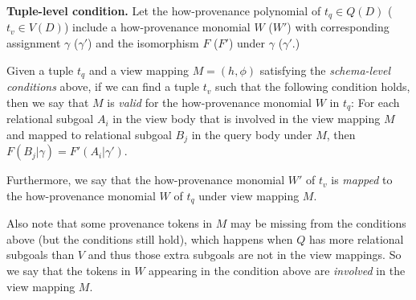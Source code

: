 \begin{definition}
{\bf Tuple-level condition.}
Let the how-pro\-venance polynomial of $t_q \in Q(D)$ ($t_v \in V(D)$) include a how-provenance monomial $W$ ($W'$) with corresponding assignment $\gamma$ ($\gamma'$) and the isomorphism $F$ ($F'$) under $\gamma$ ($\gamma'$.)

Given a tuple $t_q$ and a view mapping $M=(h,\phi)$ satisfying the {\em schema-level conditions} above, if we can find a tuple $t_v$ such that the following condition holds, then we say that $M$ is \textit{valid} for the how-provenance monomial $W$ in $t_q$:
For each relational subgoal $A_i$ in the view body that is involved in the view mapping $M$ and mapped to relational subgoal $B_j$ in the query body under $M$, then $F(B_j|\gamma) = F'(A_i|\gamma')$.


Furthermore, we say that the how-provenance monomial $W'$ of $t_v$ is {\em mapped} to the how-provenance monomial $W$ of $t_q$ under view mapping $M$.

Also note that some provenance tokens in $M$ may be missing from the conditions above (but the conditions still hold), which happens when $Q$ has more relational subgoals than $V$ and thus those extra subgoals are not in the view mappings. So we say that the tokens in $W$ appearing in the condition above are {\em involved} in the view mapping $M$.
\end{definition}



